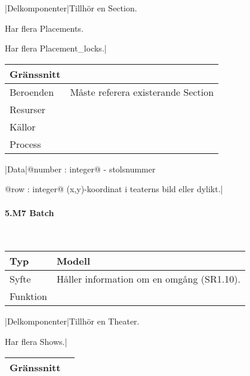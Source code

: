 \documentclass[a4paper, twoside, 11pt, titlepage]{article}
\begin{document}
			|Delkomponenter|Tillhör en Section.

			Har flera Placements.

			Har flera Placement\_locks.|

			\begin {table} [ht] \begin{tabular} {  p{3.5cm} p{9.6cm} }
				\hline
				Gränssnitt &   \\
				\hline
				Beroenden & Måste referera existerande Section  \\
				\hline
				Resurser &   \\
				\hline
				Källor &   \\
				\hline
				Process &   \\
				\hline
			\end{tabular} \end{table} \FloatBarrier
			\vspace{6mm}

			|Data|@number : integer@ - stolsnummer

			@row : integer@ (x,y)-koordinat i teaterns bild eller dylikt.|

			\paragraph{5.M7 Batch}\

			\begin {table} [ht] \begin{tabular} {  p{3.5cm} p{9.6cm} }
				\hline
				Typ & Modell  \\
				\hline
				Syfte & Håller information om en omgång (SR1.10).  \\
				\hline
				Funktion &   \\
				\hline
			\end{tabular} \end{table} \FloatBarrier
			\vspace{6mm}

			|Delkomponenter|Tillhör en Theater.

			Har flera Shows.|

			\begin {table} [ht] \begin{tabular} {  p{3.5cm} p{9.6cm} }
				\hline
				Gränssnitt &   \\
				\hline
			\end{tabular} \end{table} \FloatBarrier
			\vspace{6mm}
\end{document}
